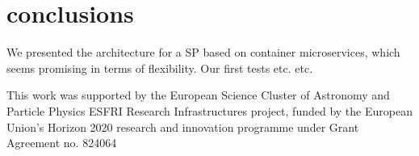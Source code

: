 \documentclass[11pt,twoside]{article}
\begin{document}
\section{conclusions}
We presented the architecture for a SP based on container microservices, which seems promising in terms of flexibility. Our first tests etc. etc.



\acknowledgements This work was supported by the European Science Cluster of Astronomy and Particle Physics ESFRI Research Infrastructures project, funded by the European Union's Horizon 2020 research and innovation programme under Grant Agreement no. 824064




\end{document}
